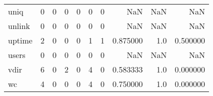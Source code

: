 \begin{longtable}{lrrrrrrrrr}
uniq      &                                       0 &                                                  0 &                                                  0 &                                                  0 &                                                  0 &                                                  0 &                                                NaN &                                    NaN &                                  NaN \\
unlink    &                                       0 &                                                  0 &                                                  0 &                                                  0 &                                                  0 &                                                  0 &                                                NaN &                                    NaN &                                  NaN \\
uptime    &                                       2 &                                                  0 &                                                  0 &                                                  0 &                                                  1 &                                                  1 &                                           0.875000 &                                    1.0 &                             0.500000 \\
users     &                                       0 &                                                  0 &                                                  0 &                                                  0 &                                                  0 &                                                  0 &                                                NaN &                                    NaN &                                  NaN \\
vdir      &                                       6 &                                                  0 &                                                  2 &                                                  0 &                                                  4 &                                                  0 &                                           0.583333 &                                    1.0 &                             0.000000 \\
wc        &                                       4 &                                                  0 &                                                  0 &                                                  0 &                                                  4 &                                                  0 &                                           0.750000 &                                    1.0 &                             0.000000 \\

\end{longtable}
